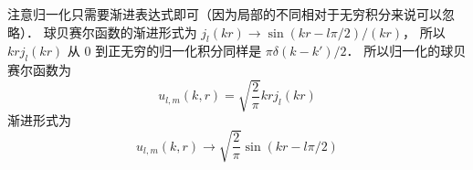 注意归一化只需要渐进表达式即可（因为局部的不同相对于无穷积分来说可以忽略）． 球贝赛尔函数的渐进形式为 $j_l(kr) \to \sin(kr - l\pi/2)/(kr)$， 所以 $kr j_l(kr)$ 从 0 到正无穷的归一化积分同样是 $\pi\delta(k-k')/2$． 所以归一化的球贝赛尔函数为
\begin{equation}
u_{l,m}(k, r) = \sqrt{\frac{2}{\pi}} kr j_l(kr)
\end{equation}
渐进形式为
\begin{equation}
u_{l,m}(k, r) \to  \sqrt{\frac{2}{\pi}} \sin(kr - l\pi/2)
\end{equation}
